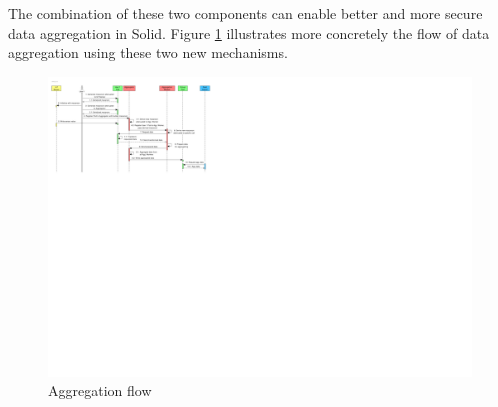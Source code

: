 The combination of these two components can enable better and more secure data aggregation in Solid. Figure \ref{fig:aggregation-flow} illustrates more concretely the flow of data aggregation using these two new mechanisms.

\begin{figure}
    \centering
    \includegraphics[width=1.0\textwidth]{images/architecture/InteractionDiagram-Aggregation-flow.pdf}
    \caption{Aggregation flow}
    \label{fig:aggregation-flow}
\end{figure}
